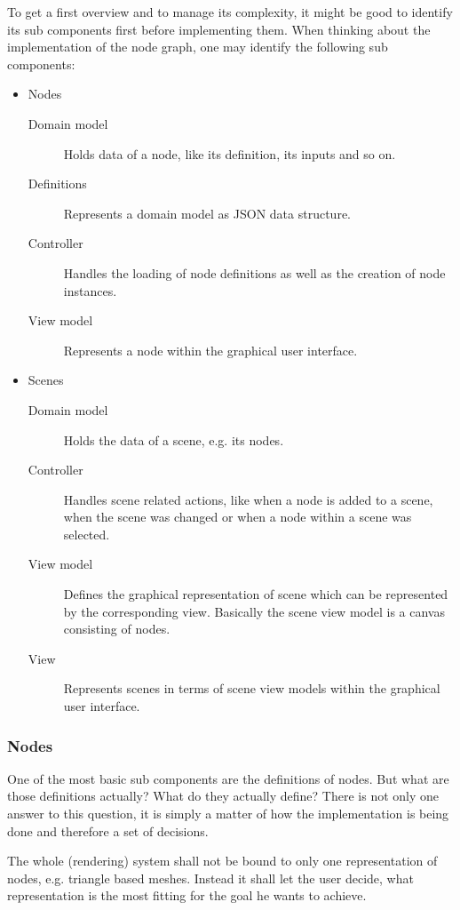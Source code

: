 \documentclass[10pt, openright, notitlepage]{scrreprt}
\begin{document}
To get a first overview and to manage its complexity, it might be good to
identify its sub components first before implementing them.
When thinking about the implementation of the node graph, one may identify the
following sub components:

\begin{itemize}
\item Nodes
\begin{description}
\item[{Domain model}] Holds data of a node, like its definition, its inputs and so
on.
\item[{Definitions }] Represents a domain model as JSON data structure.
\item[{Controller  }] Handles the loading of node definitions as well as the
creation of node instances.
\item[{View model  }] Represents a node within the graphical user interface.
\end{description}
\item Scenes
\begin{description}
\item[{Domain model}] Holds the data of a scene, e.g. its nodes.
\item[{Controller  }] Handles scene related actions, like when a node is added to
a scene, when the scene was changed or when a node within a
scene was selected.
\item[{View model  }] Defines the graphical representation of scene which can be
represented by the corresponding view. Basically the scene
view model is a canvas consisting of nodes.
\item[{View        }] Represents scenes in terms of scene view models within the
graphical user interface.
\end{description}
\end{itemize}

\subsubsection{Nodes}
\label{sec:org0bc1b09}

One of the most basic sub components are the definitions of nodes. But what are
those definitions actually? What do they actually define? There is not only one
answer to this question, it is simply a matter of how the implementation is
being done and therefore a set of decisions.

The whole (rendering) system shall not be bound to only one representation of
nodes, e.g. triangle based meshes. Instead it shall let the user decide, what
representation is the most fitting for the goal he wants to achieve.
\end{document}
